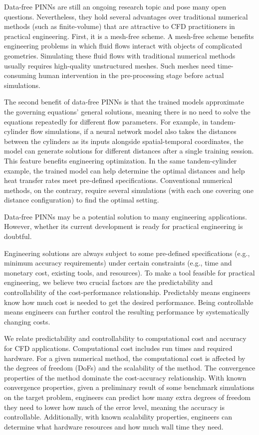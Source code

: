 
Data-free PINNs are still an ongoing research topic and pose many open questions.
Nevertheless, they hold several advantages over traditional numerical methods (such as finite-volume) that are attractive to CFD practitioners in practical engineering.
First, it is a mesh-free scheme.
A mesh-free scheme benefits engineering problems in which fluid flows interact with objects of complicated geometries.
Simulating these fluid flows with traditional numerical methods usually requires high-quality unstructured meshes.
Such meshes need time-consuming human intervention in the pre-processing stage before actual simulations.

The second benefit of data-free PINNs is that the trained models approximate the governing equations' general solutions, meaning there is no need to solve the equations repeatedly for different flow parameters.
For example, in tandem-cylinder flow simulations, if a neural network model also takes the distances between the cylinders as its inputs alongside spatial-temporal coordinates, the model can generate solutions for different distances after a single training session.
This feature benefits engineering optimization.
In the same tandem-cylinder example, the trained model can help determine the optimal distances and help heat transfer rates meet pre-defined specifications.
Conventional numerical methods, on the contrary, require several simulations (with each one covering one distance configuration) to find the optimal setting.

Data-free PINNs may be a potential solution to many engineering applications.
However, whether its current development is ready for practical engineering is doubtful.

Engineering solutions are always subject to some pre-defined specifications (e.g., minimum accuracy requirements) under certain constraints (e.g., time and monetary cost, existing tools, and resources).
To make a tool feasible for practical engineering, we believe two crucial factors are the predictability and controllability of the cost-performance relationship.
Predictably means engineers know how much cost is needed to get the desired performance.
Being controllable means engineers can further control the resulting performance by systematically changing costs.

We relate predictability and controllability to computational cost and accuracy for CFD applications.
Computational cost includes run times and required hardware.
For a given numerical method, the computational cost is affected by the degrees of freedom (DoFs) and the scalability of the method.
The convergence properties of the method dominate the cost-accuracy relationship.
With known convergence properties, given a preliminary result of some benchmark simulations on the target problem, engineers can predict how many extra degrees of freedom they need to lower how much of the error level, meaning the accuracy is controllable.
Additionally, with known scalability properties, engineers can determine what hardware resources and how much wall time they need.

